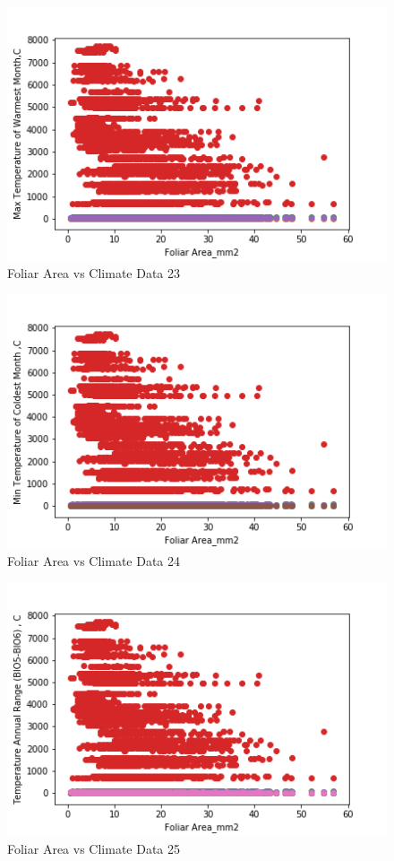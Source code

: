 \documentclass[letterpaper]{article}
\begin{document}
\begin{figure}[h]
\caption{Foliar Area vs Climate Data 23\label{fig:Foliar_Area_vs_23}}
\centering
\includegraphics[width=0.7\paperwidth]{Foliar_Area_vs_23}
\end{figure}


\begin{figure}[h]
\caption{Foliar Area vs Climate Data 24\label{fig:Foliar_Area_vs_24}}
\centering
\includegraphics[width=0.7\paperwidth]{Foliar_Area_vs_24}
\end{figure}


\begin{figure}[h]
\caption{Foliar Area vs Climate Data 25\label{fig:Foliar_Area_vs_25}}
\centering
\includegraphics[width=0.7\paperwidth]{Foliar_Area_vs_25}
\end{figure}
\end{document}
